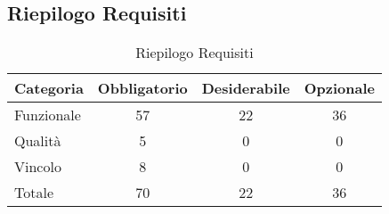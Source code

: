 \subsection{Riepilogo Requisiti}{ 
\renewcommand*{\arraystretch}{1.4} 
\begin{table}[h] 
 \begin{center} 
\begin{tabular}[c]{| p{2.5cm} | c | c | c |}  
\hline \textbf{Categoria} & \textbf{Obbligatorio} & \textbf{Desiderabile} & \textbf{Opzionale} \\ \hline 
Funzionale & 57 & 22 & 36\\ 
 \hline 
Qualità & 5 & 0 & 0\\ 
 \hline 
Vincolo & 8 & 0 & 0\\ 
 \hline 
Totale & 70 & 22 & 36\\ 
 \hline 
\end{tabular} 
 \caption{Riepilogo Requisiti\label{tab:riepilogo}}\end{center} 
 \end{table}}